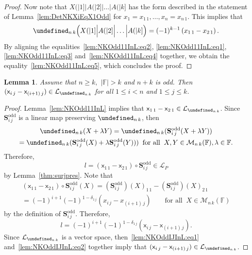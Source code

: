 \documentclass{elsarticle}
\let\det\undefined
\DeclareMathOperator{\det}{det}
\def\F{{\mathbb F}}
\def\L{{\mathcal L}}
\def\M{{\mathcal M}}
\def\SCS{{\mathbf S}}
\newtheorem{lemma}[theorem]{Lemma}
\theoremstyle{definition}
\numberwithin{equation}{section}
\begin{document}
\begin{proof}
Now note that $X(|1] \Big| A(|2] \Big| \ldots \Big| A(|k]$ has the form described in the statement of Lemma~\ref{lem:DetNKXiEqX1Odd} for $x_1 = x_{1\,1}, \ldots, x_n = x_{n\,1}$. This implies that\begin{equation}\label{lem:NKOdd11InL:eq4}
\det_{n\,k} \Bigl(X(|1] \Big| A(|2] \Big| \ldots \Big| A(|k]\Bigr) = (-1)^{k-1}\left(x_{1\,1} - x_{2\,1}\right).
\end{equation}
By aligning the equalities~\eqref{lem:NKOdd11InL:eq2}, \eqref{lem:NKOdd11InL:eq1}, \eqref{lem:NKOdd11InL:eq3} and~\eqref{lem:NKOdd11InL:eq4}  together, we obtain the equality~\eqref{lem:NKOdd11InL:eq5}, which concludes the proof.
\end{proof}



\begin{lemma}\label{lem:NKOddIJInL}Assume that  $n \ge k,$ $|\F| > k$ and  $n + k$ is odd. Then $(\mathsf x_{i\,j}  - \mathsf x_{(i+1)\,j}) \in \mathcal L_{\det_{n\,k}}$ for all $1 \le i < n$ and $1 \le j \le k$.
\end{lemma}
\begin{proof}
Lemma~\ref{lem:NKOdd11InL} implies that $\mathsf x_{1\,1} - \mathsf x_{2\,1} \in \mathcal L_{\det_{n\,k}}$. Since $\SCS^{\mathrm{odd}}_{i\,j}$ is a linear map preserving $\det_{n\,k}$, then
\begin{multline*}
\det_{n\,k}(X + \lambda Y) = \det_{n\,k}(\SCS^{\mathrm{odd}}_{i\,j}(X + \lambda Y))\\ = \det_{n\,k}(\SCS^{\mathrm{odd}}_{i\,j}(X) + \lambda \SCS^{\mathrm{odd}}_{i\,j}(Y)))\;\;\mbox{for all}\;\;X, Y \in \M_{n\,k}(\F), \lambda \in \F.
\end{multline*}
Therefore, 
\begin{equation}\label{lem:NKOddIJInL:eq1}
l =  (\mathsf x_{1\,1} - \mathsf x_{2\,1}) \circ \SCS^{\mathrm{odd}}_{i\,j} \in \mathcal L_P
\end{equation}
  by Lemma~\ref{thm:surjpres}. Note that
\begin{multline*}%
(\mathsf x_{1\,1} - \mathsf x_{2\,1}) \circ \SCS^{\mathrm{odd}}_{i\,j}(X) = (\SCS^{\mathrm{odd}}_{i\,j})(X)_{1\,1} - (\SCS^{\mathrm{odd}}_{i\,j})(X)_{2\,1}\\ = (-1)^{i+1}
(-1)^{1 - \delta_{1\,j}}\left(x_{i\,j} - x_{(i+1)\,j}\right)\qquad \mbox{for all}\;\;X \in \M_{n\,k}(\F)
\end{multline*}
by the definition of $\SCS^{\mathrm{odd}}_{i\,j}$. Therefore,
\begin{equation}\label{lem:NKOddIJInL:eq2}
l = (-1)^{i+1}
(-1)^{1 - \delta_{1\,j}}(\mathsf x_{i\,j}  - \mathsf x_{(i+1)\,j}).
\end{equation}
Since $\L_{\det_{n\,k}}$ is a vector space, then~\eqref{lem:NKOddIJInL:eq1} and~\eqref{lem:NKOddIJInL:eq2} together imply that $(\mathsf x_{i\,j}  - \mathsf x_{(i+1)\,j}) \in \L_{\det_{n\,k}}$. 
\end{proof}
\end{document}
